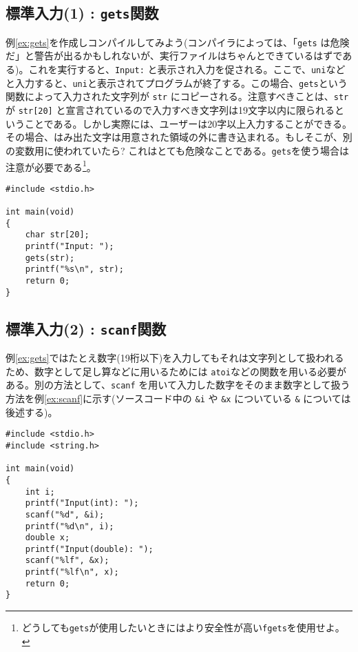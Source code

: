 \subsection{標準入力(1) : \texttt{gets}関数}
例\ref{ex:gets}を作成しコンパイルしてみよう(コンパイラによっては、「\texttt{gets} は危険だ」と警告が出るかもしれないが、実行ファイルはちゃんとできているはずである)。これを実行すると、\texttt{Input:} と表示され入力を促される。ここで、\texttt{uni}などと入力すると、\texttt{uni}と表示されてプログラムが終了する。この場合、\texttt{gets}という関数によって入力された文字列が \texttt{str} にコピーされる。注意すべきことは、\texttt{str} が \texttt{str[20]} と宣言されているので入力すべき文字列は19文字以内に限られるということである。しかし実際には、ユーザーは20字以上入力することができる。その場合、はみ出た文字は用意された領域の外に書き込まれる。もしそこが、別の変数用に使われていたら? これはとても危険なことである。\texttt{gets}を使う場合は注意が必要である\footnote{どうしても\texttt{gets}が使用したいときにはより安全性が高い\texttt{fgets}を使用せよ。}。
\begin{reidai}\label{ex:gets}
    \begin{verbatim}
#include <stdio.h>

int main(void)
{
    char str[20];
    printf("Input: ");
    gets(str);
    printf("%s\n", str);
    return 0;
}
\end{verbatim}
\end{reidai}

\subsection{標準入力(2) : \texttt{scanf}関数}
例\ref{ex:gets}ではたとえ数字(19桁以下)を入力してもそれは文字列として扱われるため、数字として足し算などに用いるためには \texttt{atoi}などの関数を用いる必要がある。別の方法として、\texttt{scanf} を用いて入力した数字をそのまま数字として扱う方法を例\ref{ex:scanf}に示す(ソースコード中の \texttt{\&i} や \texttt{\&x} についている \texttt{\&} については後述する)。
\begin{reidai}\label{ex:scanf}
    \begin{verbatim}
#include <stdio.h>
#include <string.h>

int main(void)
{
    int i;
    printf("Input(int): ");
    scanf("%d", &i);
    printf("%d\n", i);
    double x;
    printf("Input(double): ");
    scanf("%lf", &x);
    printf("%lf\n", x);
    return 0;
}
\end{verbatim}
\end{reidai}

